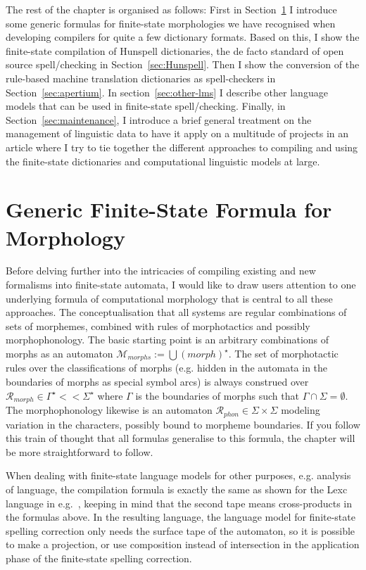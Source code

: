 \documentclass[officiallayout]{unihelcompling}
\begin{document}
The rest of the chapter is organised as follows: First in
Section~\ref{sec:generic} I introduce some generic formulas for finite-state
morphologies we have recognised when developing compilers for quite a few
dictionary formats. Based on this, I show the finite-state compilation of
Hunspell dictionaries, the de facto standard of open source spell\-/checking in
Section~\ref{sec:Hunspell}.  Then I show the conversion of the rule-based
machine translation dictionaries as spell-checkers in
Section~\ref{sec:apertium}. In section~\ref{sec:other-lms} I describe other
language models that can be used in finite-state spell\-/checking. Finally, in
Section~\ref{sec:maintenance}, I introduce a brief general treatment on the
management of linguistic data to have it apply on a multitude of projects in an
article where I try to tie together the different approaches to compiling and
using the finite-state dictionaries and computational linguistic models at
large.

\section{Generic Finite-State Formula for Morphology}
\label{sec:generic}

Before delving further into the intricacies of compiling existing and new
formalisms into finite-state automata, I would like to draw users attention to
one underlying formula of computational morphology that is central to all these
approaches. The conceptualisation that all systems are regular combinations of
sets of morphemes, combined with rules of morphotactics and possibly
morphophonology.  The basic starting point is an arbitrary combinations of
morphs as an automaton $\mathcal{M}_{morphs} := \bigcup ({morph})^\star$. The
set of morphotactic rules over the classifications of morphs (e.g. hidden in
the automata in the boundaries of morphs as special symbol arcs) is always
construed over $\mathcal{R}_{morph} \in \Gamma^\star << \Sigma^\star$ where
$\Gamma$ is the boundaries of morphs such that $\Gamma \cap \Sigma =
\emptyset$. The morphophonology likewise is an automaton $\mathcal{R}_{phon}
\in \Sigma \times \Sigma$ modeling variation in the characters, possibly bound
to morpheme boundaries. If you follow this train of thought that all formulas
generalise to this formula, the chapter will be more straightforward to follow.

When dealing with finite-state language models for other purposes, e.g.
analysis of language, the compilation formula is exactly the same as shown for
the Lexc language in e.g.~\citet{linden2009hfst}, keeping in mind that the
second tape means cross-products in the formulas above. In the resulting
language, the language model for finite-state spelling correction only needs
the surface tape of the automaton, so it is possible to make a projection, or
use composition instead of intersection in the application phase of the
finite-state spelling correction.
\end{document}
